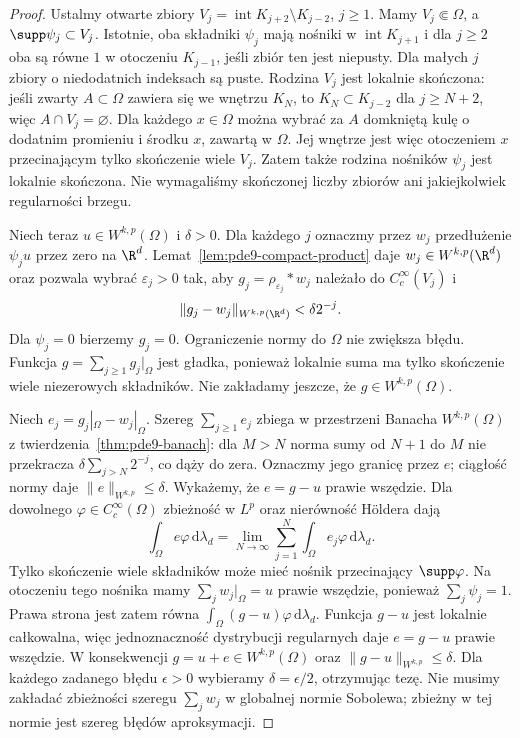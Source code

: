 \begin{proof}
Ustalmy otwarte zbiory
$V_j=\operatorname{int}K_{j+2}\setminus K_{j-2}$,
$ j\ge1$. Mamy $V_j\Subset\Omega$, a
$\supp\psi_j\subset V_j$. Istotnie, oba składniki
$\psi_j$ mają nośniki w $\operatorname{int}K_{j+1}$
i dla $j\ge2$ oba są równe $1$ w otoczeniu $K_{j-1}$,
jeśli zbiór ten jest niepusty. Dla małych $j$
zbiory o niedodatnich indeksach są puste.
Rodzina $V_j$ jest lokalnie skończona:
jeśli zwarty $A\subset\Omega$ zawiera się
we wnętrzu $K_N$, to $K_N\subset K_{j-2}$
dla $j\ge N+2$, więc $A\cap V_j=\varnothing$.
Dla każdego $x\in\Omega$ można wybrać za $A$
domkniętą kulę o dodatnim promieniu i środku $x$,
zawartą w $\Omega$. Jej wnętrze jest więc otoczeniem
$x$ przecinającym tylko skończenie wiele $V_j$. Zatem także rodzina nośników $\psi_j$
jest lokalnie skończona. Nie wymagaliśmy skończonej
liczby zbiorów ani jakiejkolwiek regularności brzegu.

Niech teraz $u\in W^{k,p}(\Omega)$ i $\delta>0$.
Dla każdego $j$ oznaczmy przez $w_j$ przedłużenie
$\psi_j u$ przez zero na $\R^d$.
Lemat~\ref{lem:pde9-compact-product} daje
$w_j\in W^{k,p}(\R^d)$ oraz pozwala wybrać
$\varepsilon_j>0$ tak, aby $g_j=\rho_{\varepsilon_j}*w_j$
należało do $C_c^\infty(V_j)$ i
\[
 \|g_j-w_j\|_{W^{k,p}(\R^d)}<\delta2^{-j}.
\]
Dla $\psi_j=0$ bierzemy $g_j=0$.
Ograniczenie normy do $\Omega$ nie zwiększa błędu.
Funkcja $g=\sum_{j\ge1}g_j|_\Omega$ jest gładka,
ponieważ lokalnie suma ma tylko skończenie wiele
niezerowych składników. Nie zakładamy jeszcze,
że $g\in W^{k,p}(\Omega)$.

Niech $e_j=g_j|_\Omega-w_j|_\Omega$.
Szereg $\sum_{j\ge1}e_j$ zbiega w przestrzeni Banacha
$W^{k,p}(\Omega)$ z twierdzenia~\ref{thm:pde9-banach}:
dla $M>N$ norma sumy od $N+1$ do $M$ nie przekracza
$\delta\sum_{j>N}2^{-j}$, co dąży do zera.
Oznaczmy jego granicę przez $e$; ciągłość normy daje
$\|e\|_{W^{k,p}}\le\delta$.
Wykażemy, że $e=g-u$ prawie wszędzie.
Dla dowolnego $\varphi\in C_c^\infty(\Omega)$
zbieżność w $L^p$ oraz nierówność Höldera dają
\[
 \int_\Omega e\varphi\,\mathrm d\lambda_d
 =\lim_{N\to\infty}\sum_{j=1}^N
 \int_\Omega e_j\varphi\,\mathrm d\lambda_d.
\]
Tylko skończenie wiele składników może mieć
nośnik przecinający $\supp\varphi$.
Na otoczeniu tego nośnika mamy
$\sum_j w_j|_\Omega=u$ prawie wszędzie,
ponieważ $\sum_j\psi_j=1$.
Prawa strona jest zatem równa
$\int_\Omega(g-u)\varphi\,\mathrm d\lambda_d$.
Funkcja $g-u$ jest lokalnie całkowalna, więc
jednoznaczność dystrybucji regularnych daje
$e=g-u$ prawie wszędzie. W konsekwencji
$g=u+e\in W^{k,p}(\Omega)$ oraz
$\|g-u\|_{W^{k,p}}\le\delta$.
Dla każdego zadanego błędu $\epsilon>0$
wybieramy $\delta=\epsilon/2$, otrzymując tezę.
Nie musimy zakładać zbieżności szeregu $\sum_j w_j$
w globalnej normie Sobolewa; zbieżny w tej normie
jest szereg błędów aproksymacji.
\end{proof}

